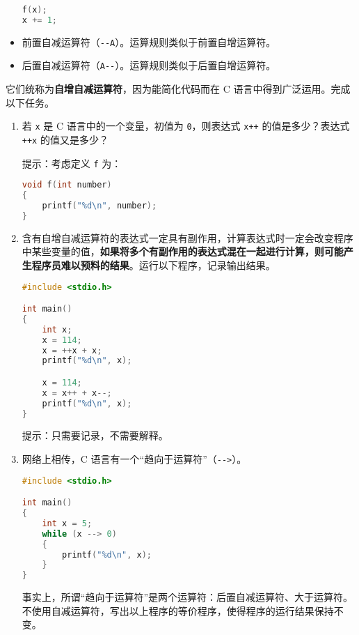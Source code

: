 \begin{problemset}
\begin{itemize}
		\begin{lstlisting}[language=c, numbers=none, moreemph={[2]f}]
f(x);
x += 1;
		\end{lstlisting}

		\item 前置自减运算符（\lstinline{--A}）。运算规则类似于前置自增运算符。

		\item 后置自减运算符（\lstinline{A--}）。运算规则类似于后置自增运算符。
	\end{itemize}

	它们统称为\textbf{自增自减运算符}，因为能简化代码而在 C 语言中得到广泛运用。完成以下任务。

	\begin{enumerate}
		\item 若 \lstinline{x} 是 C 语言中的一个变量，初值为 \lstinline{0}，则表达式 \lstinline{x++} 的值是多少？表达式 \lstinline{++x} 的值又是多少？

		提示：考虑定义 \lstinline[language=c, moreemph={[2]f}]{f} 为：

		\begin{lstlisting}[language=c, numbers=none, moreemph={[2]f}]
void f(int number)
{
	printf("%d\n", number);
}
		\end{lstlisting}

		\item 含有自增自减运算符的表达式一定具有副作用，计算表达式时一定会改变程序中某些变量的值，\textbf{如果将多个有副作用的表达式混在一起进行计算，则可能产生程序员难以预料的结果}。运行以下程序，记录输出结果。

		\begin{lstlisting}[language=c]
#include <stdio.h>

int main()
{
	int x;
	x = 114;
	x = ++x + x;
	printf("%d\n", x);

	x = 114;
	x = x++ + x--;
	printf("%d\n", x);
}
		\end{lstlisting}

		提示：只需要记录，不需要解释。

		\item 网络上相传，C 语言有一个“趋向于运算符”（\lstinline{-->}）。

		\begin{lstlisting}[language=c]
#include <stdio.h>

int main()
{
	int x = 5;
	while (x --> 0)
	{
		printf("%d\n", x);
	}
}
		\end{lstlisting}

		事实上，所谓“趋向于运算符”是两个运算符：后置自减运算符、大于运算符。不使用自减运算符，写出以上程序的等价程序，使得程序的运行结果保持不变。
	\end{enumerate}


\end{problemset}
